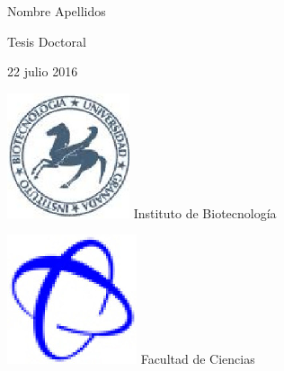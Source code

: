 \documentclass[b5paper,twoside,10pt]{book}
\newcommand{\fecha}{22 julio 2016}
\begin{document}
\begin{center}
\large
Nombre Apellidos
\end{center}
\begin{center}
\large
Tesis Doctoral

\fecha
\end{center}
\cleardoublepage
\thispagestyle{empty}
\begin{minipage}[t]{.23\textwidth}
\centering
\includegraphics[width=.8\textwidth]{logo_ib}
Instituto de Biotecnolog\'ia 
\end{minipage}
\hfill
\begin{minipage}[t]{.23\textwidth}
\centering
\includegraphics[width=.7\textwidth]{logo_ciencias}
Facultad de Ciencias
\end{minipage}
\end{document}
